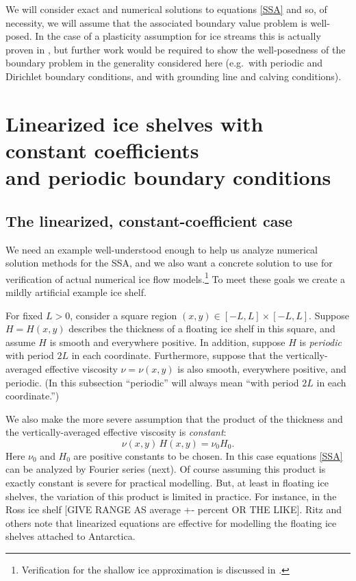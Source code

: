 \documentclass[12pt]{amsart}%
\theoremstyle{plain}
\theoremstyle{definition}
\begin{document}
We will consider exact and numerical solutions to equations \eqref{SSA} and so, of necessity, we will assume that the associated boundary value problem is well-posed.  In the case of a plasticity assumption for ice streams this is actually proven in \cite{SchoofStream}, but further work would be required to show the well-posedness of the boundary problem in the generality considered here (e.g.~with periodic and Dirichlet boundary conditions, and with grounding line and calving conditions).

\section{Linearized ice shelves with constant coefficients \\ and periodic boundary conditions}\label{sect:case1}

\subsection{The linearized, constant-coefficient case}  We need an example well-understood enough to help us analyze numerical solution methods for the SSA, and we also want a concrete solution to use for verification of actual numerical ice flow models.\footnote{Verification for the shallow ice approximation is discussed in \cite{BBL,BLKCB}.}  To meet these goals we create a mildly artificial example ice shelf.

For fixed $L>0$, consider a square region $(x,y) \in [-L,L]\times [-L,L]$.  Suppose $H=H(x,y)$ describes the thickness of a floating ice shelf in this square, and assume $H$ is smooth and everywhere positive.  In addition, suppose $H$ is \emph{periodic} with period $2L$ in each coordinate.  Furthermore, suppose that the vertically-averaged effective viscosity $\nu=\nu(x,y)$ is also smooth, everywhere positive, and periodic.  (In this subsection ``periodic'' will always mean ``with period $2L$ in each coordinate.'')

We also make the more severe assumption that the product of the thickness and the vertically-averaged effective viscosity is \emph{constant}:
\begin{equation}\label{nuHconstant}
  \nu(x,y)\, H(x,y) = \nu_0 H_0.
\end{equation}
Here $\nu_0$ and $H_0$ are positive constants to be chosen.  In this case equations \eqref{SSA} can be analyzed by Fourier series (next).  Of course assuming this product is exactly constant is severe for practical modelling.  But, at least in floating ice shelves, the variation of this product is limited in practice.  For instance, in the Ross ice shelf [GIVE RANGE AS average +- percent OR THE LIKE].  Ritz and others \cite{Ritzetal2001} note that linearized equations are effective for modelling the floating ice shelves attached to Antarctica.
\end{document}
